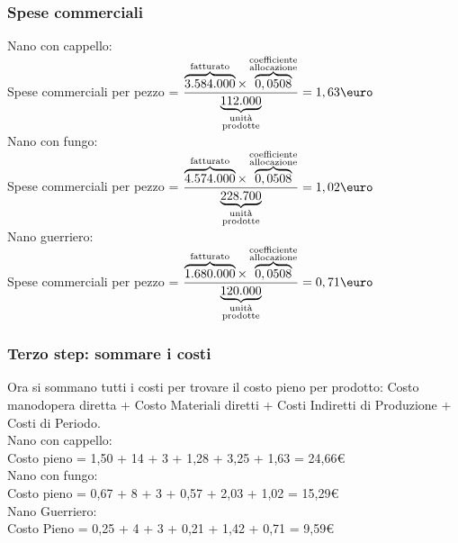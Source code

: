 \documentclass{article}
\begin{document}
\subsubsection*{Spese commerciali}
Nano con cappello:\\
Spese commerciali per pezzo = $ \dfrac{\overbrace{3.584.000}^{\text{fatturato}} \times \overbrace{0,0508}^{\substack{\text{coefficiente} \\ \text{allocazione}}}}{\underbrace{112.000}_{\substack{\text{unità} \\ \text{prodotte}}}}=1,63\T{\euro}$
\vspace*{0.1cm}\\
Nano con fungo:\\
Spese commerciali per pezzo = $ \dfrac{\overbrace{4.574.000}^{\text{fatturato}} \times \overbrace{0,0508}^{\substack{\text{coefficiente} \\ \text{allocazione}}}}{\underbrace{228.700}_{\substack{\text{unità} \\ \text{prodotte}}}}=1,02\T{\euro}$
\vspace*{0.1cm}\\
Nano guerriero:\\
Spese commerciali per pezzo = $ \dfrac{\overbrace{1.680.000}^{\text{fatturato}} \times \overbrace{0,0508}^{\substack{\text{coefficiente} \\ \text{allocazione}}}}{\underbrace{120.000}_{\substack{\text{unità} \\ \text{prodotte}}}}=0,71\T{\euro}$

\subsubsection*{Terzo step: sommare i costi}
Ora si sommano tutti i costi per trovare il costo pieno per prodotto: Costo manodopera diretta + Costo Materiali diretti + Costi Indiretti di Produzione + Costi di Periodo.
\vspace*{0.2cm}\\
Nano con cappello:\\
Costo pieno = 1,50 + 14 + 3 + 1,28 + 3,25 + 1,63 = 24,66\euro 
\vspace*{0.2cm}\\
Nano con fungo:\\
Costo pieno = 0,67 + 8 + 3 + 0,57 + 2,03 + 1,02 = 15,29\euro 
\vspace*{0.2cm}\\
Nano Guerriero:\\
Costo Pieno = 0,25 + 4 + 3 + 0,21 + 1,42 + 0,71 = 9,59\euro 
\end{document}
